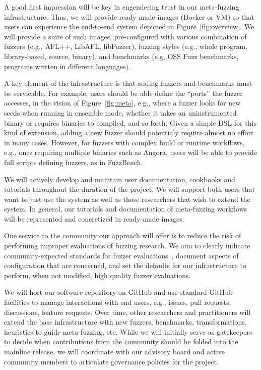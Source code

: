 

A good first impression will be key in engendering trust in our meta-fuzzing infrastructure.
Thus, we will provide ready-made images (Docker or VM) so that users can experience
the end-to-end system depicted in Figure~\ref{fig:overview}.
We will provide a suite of such images, pre-configured with various combination of
fuzzers (e.g., AFL++, LibAFL, libFuzzer), 
fuzzing styles (e.g., whole program, library-based, source, binary), 
and benchmarks (e.g, OSS Fuzz benchmarks, programs written in
different languages).

A key element of the infrastructure is that adding fuzzers and
benchmarks must be servicable. For example, users should be able define the
``ports'' the fuzzer accesses, in the vision of Figure~\ref{fig:meta},
e.g., where a fuzzer looks for new seeds when running in ensemble
mode, whether it takes an uninstrumented binary or requires binaries
to compiled, and so forth.  Given a simple DSL for this kind of
extension, adding a new fuzzer should potentialy require almost no
effort in many cases.  However, for fuzzers with complex build or
runtime workflows, e.g., ones requiring multiple binaries such as
Angora, users will be able to provide full scripts defining fuzzers,
as in FuzzBench.

We will actively develop and maintain user documentation, cookbooks and tutorials throughout
the duration of the project. We will support both users that want to just use the system
as well as those researchers that wish to extend the system.
In general, our tutorials and documentation of meta-fuzzing workflows will be
represented and concretized in ready-made images.

One service to the community our approach will offer is to reduce the
risk of performing improper evaluations of fuzzing research.  We aim
to clearly indicate community-expected standards for fuzzer
evaluations~\cite{FuzzerHicks}, document aspects of configuration that
are concerned, and set the defaults for our infrastructure to perform,
when not modified, high quality fuzzer evaluations.

We will host our software repository on GitHub and use standard GitHub facilities
to manage interactions with end users, e.g., issues, pull requests, discussions, feature requests.
Over time, other researchers and practitioners will extend the base infrastructure with
new fuzzers, benchmarks, transformations, heuristics to guide meta-fuzzing, etc. 
While we will initially serve as gatekeepers to decide when contributions from the community
should be folded into the mainline release, we will coordinate with our advisory board and active community 
members to articulate governance policies for the project.

